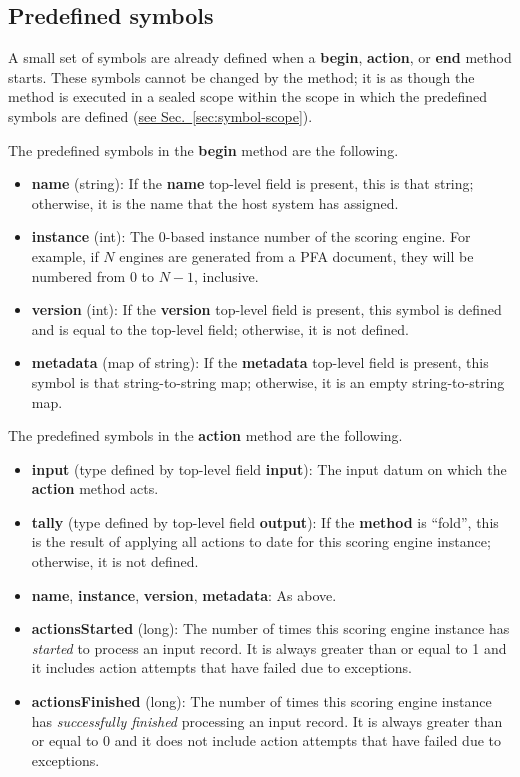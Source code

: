 \documentclass{article}
\newcommand{\PFAc}{\ttfamily\bfseries}
\theoremstyle{definition}
\begin{document}
\hypertarget{hsec:predefs}{}
\subsection{Predefined symbols}
\label{sec:predefs}

A small set of symbols are already defined when a {\PFAc begin}, {\PFAc action}, or {\PFAc end} method starts.  These symbols cannot be changed by the method; it is as though the method is executed in a sealed scope within the scope in which the predefined symbols are defined (\hyperlink{hsec:symbol-scope}{see Sec.~\ref{sec:symbol-scope}}).

\noindent The predefined symbols in the {\PFAc begin} method are the following.
\begin{itemize}
\item {\PFAc name} (string): If the {\PFAc name} top-level field is present, this is that string; otherwise, it is the name that the host system has assigned.
\item {\PFAc instance} (int): The 0-based instance number of the scoring engine.  For example, if $N$ engines are generated from a PFA document, they will be numbered from $0$ to $N-1$, inclusive.
\item {\PFAc version} (int): If the {\PFAc version} top-level field is present, this symbol is defined and is equal to the top-level field; otherwise, it is not defined.
\item {\PFAc metadata} (map of string): If the {\PFAc metadata} top-level field is present, this symbol is that string-to-string map; otherwise, it is an empty string-to-string map.
\end{itemize}

\noindent The predefined symbols in the {\PFAc action} method are the following.
\begin{itemize}
\item {\PFAc input} (type defined by top-level field {\PFAc input}): The input datum on which the {\PFAc action} method acts.
\item {\PFAc tally} (type defined by top-level field {\PFAc output}): If the {\PFAc method} is ``fold'', this is the result of applying all actions to date for this scoring engine instance; otherwise, it is not defined.
\item {\PFAc name}, {\PFAc instance}, {\PFAc version}, {\PFAc metadata}: As above.
\item {\PFAc actionsStarted} (long): The number of times this scoring engine instance has {\it started} to process an input record.  It is always greater than or equal to 1 and it includes action attempts that have failed due to exceptions.
\item {\PFAc actionsFinished} (long): The number of times this scoring engine instance has {\it successfully finished} processing an input record.  It is always greater than or equal to 0 and it does not include action attempts that have failed due to exceptions.
\end{itemize}
\end{document}
